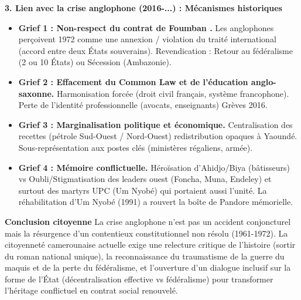 \documentclass[11pt]{article}
\newcommand{\cle}[1]{{\popxbold\color{popdark}#1}}
\begin{document}
\begin{exoresolu}
\textbf{3. Lien avec la crise anglophone (2016-...) : Mécanismes historiques}
\begin{itemize}
    \item \textbf{Grief 1 : Non-respect du \guillemotleft contrat de Foumban \guillemotright.} Les anglophones perçoivent 1972 comme une \cle{annexion} / violation du traité international (accord entre deux États souverains). Revendication : \cle{Retour au fédéralisme} (2 ou 10 États) ou \cle{Sécession} (Ambazonie).
    \item \textbf{Grief 2 : Effacement du \cle{Common Law} et de l'\cle{éducation} anglo-saxonne.} Harmonisation forcée (droit civil français, système francophone). Perte de l'identité professionnelle (avocats, enseignants) \rightarrow Grèves 2016.
    \item \textbf{Grief 3 : \cle{Marginalisation politique et économique}.} Centralisation des recettes (pétrole Sud-Ouest / Nord-Ouest) \rightarrow redistribution opaques à Yaoundé. Sous-représentation aux postes clés (ministères régaliens, armée).
    \item \textbf{Grief 4 : \cle{Mémoire conflictuelle}.} Héroïsation d'Ahidjo/Biya (bâtisseurs) vs Oubli/Stigmatisation des leaders ouest (Foncha, Muna, Endeley) et surtout des \cle{martyrs UPC} (Um Nyobé) qui portaient aussi l'unité. La \cle{réhabilitation d'Um Nyobé (1991)} a rouvert la boîte de Pandore mémorielle.
\end{itemize}

\textbf{Conclusion citoyenne}
La crise anglophone n'est pas un accident conjoncturel mais la \cle{résurgence d'un contentieux constitutionnel non résolu} (1961-1972). La citoyenneté camerounaise actuelle exige une \cle{relecture critique de l'histoire} (sortir du roman national unique), la \cle{reconnaissance du traumatisme} de la guerre du maquis et de la perte du fédéralisme, et l'ouverture d'un \cle{dialogue inclusif} sur la forme de l'État (décentralisation effective vs fédéralisme) pour transformer l'héritage conflictuel en contrat social renouvelé.
\end{exoresolu}
\end{document}
